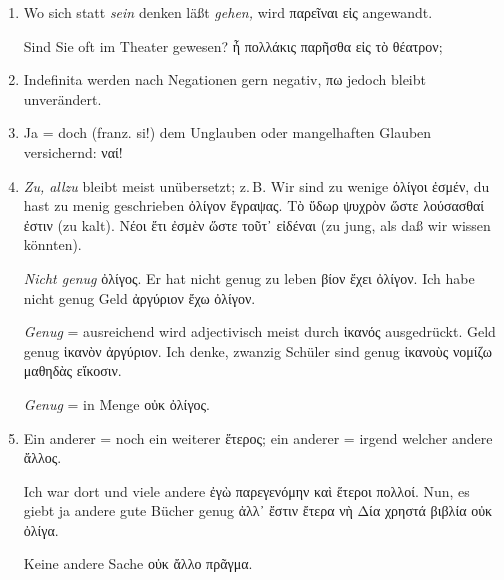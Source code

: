 \begin{enumerate}[leftmargin=0pt,rightmargin=0pt,listparindent =1cm,labelindent=1cm,labelsep=1ex,labelwidth={*},itemindent={*},align=left]
\item Wo sich statt \emph{sein} denken läßt \emph{gehen,} wird \textgreek[variant=ancient]{παρεῖναι
εἰς} angewandt.


\begin{continuousexamples}Sind Sie oft im Theater gewesen? \textgreek[variant=ancient]{ἦ
πολλάκις παρῆσθα εἰς τὸ θέατρον;}\par\end{continuousexamples}

\item Indefinita werden nach Negationen gern negativ, \textgreek[variant=ancient]{πω}
jedoch bleibt unverändert.
\item Ja = doch (franz. \textfrench{si!}) dem Unglauben oder mangelhaften
Glauben versichernd: \textgreek[variant=ancient]{ναί! }
\item \emph{Zu, allzu} bleibt meist unübersetzt; z.\,B. Wir sind zu wenige
\textgreek[variant=ancient]{ὀλίγοι ἐσμέν,} du hast zu menig geschrieben
\textgreek[variant=ancient]{ὀλίγον ἔγραψας.} \textgreek[variant=ancient]{Τὸ
ὕδωρ ψυχρὸν ὥστε λούσασθαί ἐστιν} (zu kalt). \textgreek[variant=ancient]{Νέοι
ἔτι ἐσμὲν ὥστε τοῦτ᾽ εἰδέναι} (zu jung, als daß wir wissen könnten).


\emph{Nicht genug} \textgreek[variant=ancient]{ὀλίγος.} Er hat nicht
genug zu leben \textgreek[variant=ancient]{βίον ἔχει ὀλίγον.} Ich
habe nicht genug Geld \textgreek[variant=ancient]{ἀργύριον ἔχω ὀλίγον.}


\emph{Genug} = ausreichend wird adjectivisch meist durch \textgreek[variant=ancient]{ἱκανός}
ausgedrückt. Geld genug \textgreek[variant=ancient]{ἱκανὸν ἀργύριον.}
Ich denke, zwanzig Schüler sind genug \textgreek[variant=ancient]{ἱκανοὺς
νομίζω μαθηδὰς εἴκοσιν.}


\emph{Genug} = in Menge \textgreek[variant=ancient]{οὐκ ὀλίγος.}

\item Ein anderer = noch ein weiterer \textgreek[variant=ancient]{ἕτερος;
}ein anderer = irgend welcher andere \textgreek[variant=ancient]{ἄλλος.}


Ich war dort und viele andere \textgreek[variant=ancient]{ἐγὼ παρεγενόμην
καὶ ἕτεροι πολλοί.} Nun, es giebt ja andere gute Bücher genug \textgreek[variant=ancient]{ἀλλ᾽
ἔστιν ἔτερα νὴ Δία χρηστά βιβλία οὐκ ὀλίγα.}


\begin{continuousitemline}Keine andere Sache \textgreek[variant=ancient]{οὐκ
ἄλλο πρᾶγμα.}



\end{continuousitemline}
\end{enumerate}
